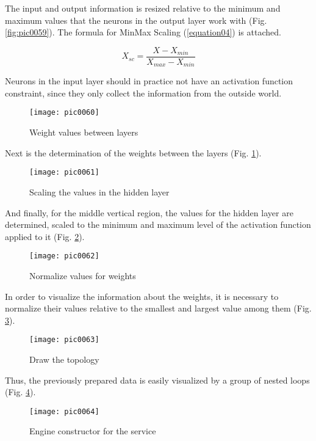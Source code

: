 The input and output information is resized relative to the minimum and maximum values that the neurons in the output layer work with (Fig. \ref{fig:pic0059}). The formula for MinMax Scaling (\ref{equation04}) is attached.

\begin{equation}
\label{equation04}
X_{sc} = \frac{X-X_{min}}{X_{max}-X_{min}}
\end{equation}

Neurons in the input layer should in practice not have an activation function constraint, since they only collect the information from the outside world.

\begin{figure}[h]
\centering
\texttt{[image: pic0060]}
\caption{Weight values between layers}
\label{fig:pic0060}
\end{figure}
\FloatBarrier

Next is the determination of the weights between the layers (Fig. \ref{fig:pic0060}).

\begin{figure}[h]
\centering
\texttt{[image: pic0061]}
\caption{Scaling the values in the hidden layer}
\label{fig:pic0061}
\end{figure}
\FloatBarrier

And finally, for the middle vertical region, the values for the hidden layer are determined, scaled to the minimum and maximum level of the activation function applied to it (Fig. \ref{fig:pic0061}).

\begin{figure}[h]
\centering
\texttt{[image: pic0062]}
\caption{Normalize values for weights}
\label{fig:pic0062}
\end{figure}
\FloatBarrier

In order to visualize the information about the weights, it is necessary to normalize their values relative to the smallest and largest value among them (Fig. \ref{fig:pic0062}).

\begin{figure}[h]
\centering
\texttt{[image: pic0063]}
\caption{Draw the topology}
\label{fig:pic0063}
\end{figure}
\FloatBarrier

Thus, the previously prepared data is easily visualized by a group of nested loops (Fig. \ref{fig:pic0063}).

\begin{figure}[h]
\centering
\texttt{[image: pic0064]}
\caption{Engine constructor for the service}
\label{fig:pic0064}
\end{figure}
\FloatBarrier


